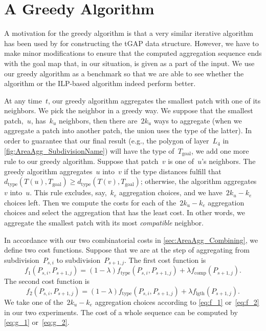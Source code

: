 \documentclass[acmsmall,natbib=false]{acmart}
\begin{document}
\section{A Greedy Algorithm}
\label{sec:AreaAgg_Greedy}


A motivation for the greedy algorithm is that 
a very similar iterative algorithm has been used by
\textcite{vanOosterom2005} 
for constructing the tGAP data structure.
However, we have to make minor modifications to ensure that 
the computed aggregation sequence ends with the goal map that, 
in our situation, is given as a part of the input.
We use our greedy algorithm as a benchmark
so that we are able to see 
whether the \Astar algorithm or the ILP-based algorithm 
indeed perform better.

At any time~$t$,
our greedy algorithm aggregates the smallest patch
with one of its neighbors.
We pick the neighbor in a greedy way.
We suppose that the smallest patch,~$u$, has~$k_u$ neighbors,
then there are~$2k_u$ ways to aggregate
(when we aggregate a patch into another patch,
the union uses the type of the latter).
In order to guarantee that our final result
(e.g., the polygon of layer~$L_4$ in 
\fig\ref{fig:AreaAgg_SubdivisionName})
will have the type of~$T_\mathrm{goal}$,
we add one more rule to our greedy algorithm.
Suppose that patch~$v$ is one of~$u$'s neighbors.
The greedy algorithm aggregates~$u$ into~$v$ 
if the type distances fulfill that
$d_\mathrm{type}\left(T(u), T_\mathrm{goal}\right) 
\ge d_\mathrm{type}\left(T(v), T_\mathrm{goal}\right)$;
otherwise, the algorithm aggregates~$v$ into~$u$.
This rule excludes, say,~$k_e$ aggregation choices,
and we have~$2k_u - k_e$ choices left.
Then we compute the costs for each of 
the~$2k_u - k_e$ aggregation choices
and select the aggregation that has the least cost.
In other words, we aggregate the smallest patch with 
its most \emph{compatible} neighbor.

In accordance with our two combinatorial costs in 
\sect\ref{sec:AreaAgg_Combining},
we define two cost functions.
Suppose that we are at the step of aggregating 
from subdivision~$P_{s,i}$ to subdivision~$P_{s+1,j}$.
The first cost function is 
\begin{equation}
\label{eq:f_1}
f_1(P_{s,i},P_{s+1,j})=
(1-\lambda)f_\mathrm{type}(P_{s,i},P_{s+1,j})
+\lambda f_{\mathrm{comp}}(P_{s+1,j}).
\end{equation}
The second cost function is
\begin{equation}
\label{eq:f_2}
f_2(P_{s,i},P_{s+1,j})=
(1-\lambda)f_\mathrm{type}(P_{s,i},P_{s+1,j})
+\lambda f_{\mathrm{lgth}}(P_{s+1,j}).
\end{equation}
We take one of the~$2k_u - k_e$ aggregation choices 
according to \eqs\ref{eq:f_1} or~\ref{eq:f_2}
in our two experiments.
The cost of a whole sequence can be computed by
\eqs\ref{eq:g_1} or~\ref{eq:g_2}.
\end{document}
